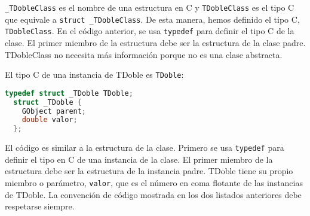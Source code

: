 \texttt{\_TDobleClass} es el nombre de una estructura en C y \texttt{TDobleClass} es el tipo C que equivale
a \texttt{struct \_TDobleClass}. De esta manera, hemos definido el tipo C, \texttt{TDobleClass}.
En el código anterior, se usa \texttt{typedef} para definir el tipo C de la clase. El primer miembro de la estructura
debe ser la estructura de la clase padre. \textsf{TDobleClass} no necesita más información porque no es una
clase abstracta.

\newpage
El tipo C de una instancia de \textsf{TDoble} es \texttt{TDoble}:
\begin{lstlisting}[language=C]
  typedef struct _TDoble TDoble;
  struct _TDoble {
    GObject parent;
    double valor;
  };
\end{lstlisting}
  
El código es similar a la estructura de la clase. Primero se usa \texttt{typedef} para definir el tipo en C de una
instancia de la clase. El primer miembro de la estructura debe ser la estructura de la instancia padre.
\textsf{TDoble} tiene su propio miembro o parámetro, \texttt{valor}, que es el número en coma flotante
de las instancias de \textsf{TDoble}.
La convención de código mostrada en los dos listados anteriores debe respetarse siempre.





